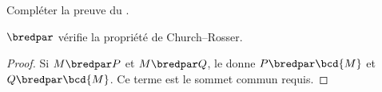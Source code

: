 \documentclass[../../../include/open-logic-section]{subfiles}
\begin{document}
\begin{prob}
Compléter la preuve du .
\end{prob}

\begin{thm}
$\bredpar$ vérifie la propriété de
Church--Rosser.
\end{thm}

\begin{proof}
Si $M\bredpar P$ et $M\bredpar Q$,
le  donne
$P\bredpar\bcd{M}$ et
$Q\bredpar\bcd{M}$. Ce terme est le
sommet commun requis.
\end{proof}
\end{document}
